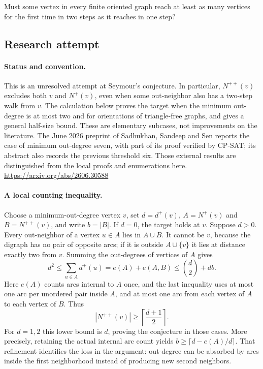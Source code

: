 \documentclass[11pt,a4paper]{article}
\begin{document}
Must some vertex in every finite oriented graph reach at least as many vertices for the first time in two steps as it reaches in one step?

\subsection{Research attempt}
\paragraph{Status and convention.}
This is an unresolved attempt at Seymour's conjecture. In particular,
$N^{++}(v)$ excludes both $v$ and $N^+(v)$, even when some out-neighbor
also has a two-step walk from $v$. The calculation below proves the
target when the minimum out-degree is at most two and for orientations
of triangle-free graphs, and gives a general half-size bound. These
are elementary subcases, not improvements on the literature.
The June 2026 preprint of Sadhukhan, Sandeep and Sen reports the case
of minimum out-degree seven, with part of its proof verified by CP-SAT;
its abstract also records the previous threshold six. Those external
results are distinguished from the local proofs and enumerations here.
\url{https://arxiv.org/abs/2606.30588}

\paragraph{A local counting inequality.}
Choose a minimum-out-degree vertex $v$, set $d=d^+(v)$,
$A=N^+(v)$ and $B=N^{++}(v)$, and write $b=|B|$. If $d=0$, the target
holds at $v$. Suppose $d>0$. Every out-neighbor of a vertex $u\in A$
lies in $A\cup B$. It cannot be $v$, because the digraph has no pair
of opposite arcs; if it is outside $A\cup\{v\}$ it lies at distance
exactly two from $v$. Summing the out-degrees of vertices of $A$ gives
\[
 d^2\leq\sum_{u\in A}d^+(u)=e(A)+e(A,B)
       \leq\binom d2+db.
\]
Here $e(A)$ counts arcs internal to $A$ once, and the last inequality
uses at most one arc per unordered pair inside $A$, and at most one
arc from each vertex of $A$ to each vertex of $B$. Thus
\[
 |N^{++}(v)|\geq\left\lceil\frac{d+1}{2}\right\rceil.
\]
For $d=1,2$ this lower bound is $d$, proving the conjecture in those
cases. More precisely, retaining the actual internal arc count yields
$b\geq\lceil d-e(A)/d\rceil$. That refinement identifies the loss in
the argument: out-degree can be absorbed by arcs inside the first
neighborhood instead of producing new second neighbors.
\end{document}

